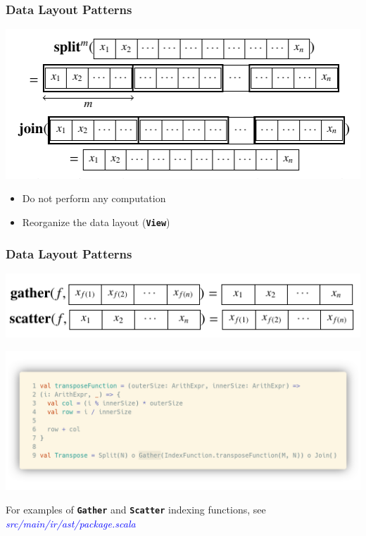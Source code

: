 \documentclass[10pt,usetotalslideindicator]{beamer}
\newcommand{\srcurl}[1]{\textcolor{blue}{\textit{#1}}}
\newcommand{\code}[1]{\textbf{\texttt{#1}}}
\begin{document}
\begin{frame}
\frametitle{Data Layout Patterns}
    \begin{block}{}
        \begin{center}
            \includegraphics[width=.85\textwidth]{../images/data_layout_patterns1.pdf}
        \end{center}
    \end{block}
\begin{itemize}
	\item Do not perform any computation
	\item Reorganize the data layout (\code{View})
\end{itemize}
\end{frame}


\begin{frame}
\frametitle{Data Layout Patterns}
    \vspace{-.5cm}
    \begin{block}{}
        \begin{center}
            \includegraphics[width=.85\textwidth]{../images/data_layout_patterns2.pdf}
        \end{center}
        \vspace{-.5cm}
        \begin{center}
            \includegraphics[width=.85\textwidth]{../images/gather.png}
        \end{center}
    \end{block}
    \vspace{-.5cm}
\begin{center}
	For examples of \code{Gather} and \code{Scatter} indexing functions, see \srcurl{src/main/ir/ast/package.scala}
\end{center}
\end{frame}
\end{document}
